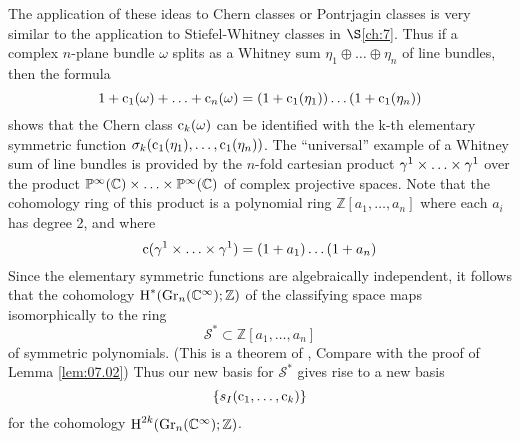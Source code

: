 \documentclass[../main]{subfiles}
\begin{document}
The application of these ideas to Chern classes or Pontrjagin classes is very similar to the application to Stiefel-Whitney classes in $\S$\ref{ch:7}. Thus if a complex $n$-plane bundle $\omega$ splits as a Whitney sum $\eta_{1} \oplus \ldots \oplus \eta_{n}$ of line bundles, then the formula
\[
1+\operatorname{c}_{1}(\omega)+\ldots+\operatorname{c}_{n}(\omega)=(1+\operatorname{c}_{1}(\eta_{1})) \ldots(1+\operatorname{c}_{1}(\eta_{n}))
\]
shows that the Chern class $\operatorname{c}_{k}(\omega)$ can be identified with the k-th elementary symmetric function $\sigma_{k}(\operatorname{c}_{1}(\eta_{1}), \ldots, \operatorname{c}_{1}(\eta_{n}))$. The ``universal'' example of a Whitney sum of line bundles is provided by the $n$-fold cartesian product $\gamma^{1} \times \ldots \times \gamma^{1}$ over the product $\mathbb{P}^{\infty}(\mathbb{C}) \times \ldots \times \mathbb{P}^{\infty}(\mathbb{C})$ of complex projective spaces. Note that the cohomology ring of this product is a polynomial ring $\mathbb{Z}[a_{1}, \ldots, a_{n}]$ where each $a_{i}$ has degree 2, and where
\[
\operatorname{c}(\gamma^{1} \times \ldots \times \gamma^{1})=(1+a_{1}) \ldots(1+a_{n})
\]
Since the elementary symmetric functions are algebraically independent, it follows that the cohomology $\operatorname{H}^{*}(\operatorname{Gr}_{n}(\mathbb{C}^{\infty}) ; \mathbb{Z})$ of the classifying space maps isomorphically to the ring
\[
\mathcal{S}^{*} \subset \mathbb{Z}[a_{1}, \ldots, a_{n}]
\]
of symmetric polynomials. (This is a theorem of \cite{Borel1953}, Compare with the proof of Lemma \ref{lem:07.02}) Thus our new basis for $\mathcal{S}^{*}$ gives rise to a new basis
\[
\{s_{I}(\operatorname{c}_{1}, \ldots, \operatorname{c}_{k})\}
\]
for the cohomology $\operatorname{H}^{2k}(\operatorname{Gr}_n(\mathbb{C}^\infty);\mathbb{Z})$.
\end{document}
